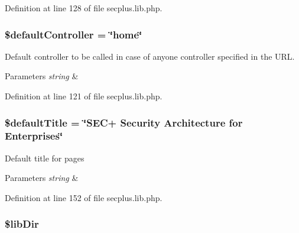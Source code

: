 Definition at line 128 of file secplus.lib.php.

\hypertarget{class_sec_plus_1_1_config_a3fcaeb229c94173ba904952898e7bfed}{
\subsubsection[{\$defaultController}]{\setlength{\rightskip}{0pt plus 5cm}\$defaultController = \char`\"{}home\char`\"{}}}
\label{class_sec_plus_1_1_config_a3fcaeb229c94173ba904952898e7bfed}
Default controller to be called in case of anyone controller specified in the URL. 
\begin{DoxyParams}{Parameters}
{\em string} & \\
\hline
\end{DoxyParams}


Definition at line 121 of file secplus.lib.php.

\hypertarget{class_sec_plus_1_1_config_a180d1e674404fdbb273b10ffce61d7fb}{
\subsubsection[{\$defaultTitle}]{\setlength{\rightskip}{0pt plus 5cm}\$defaultTitle = \char`\"{}SEC+ Security Architecture for Enterprises\char`\"{}}}
\label{class_sec_plus_1_1_config_a180d1e674404fdbb273b10ffce61d7fb}
Default title for pages 
\begin{DoxyParams}{Parameters}
{\em string} & \\
\hline
\end{DoxyParams}


Definition at line 152 of file secplus.lib.php.

\hypertarget{class_sec_plus_1_1_config_a662682afa081c488ee7d6b2de6bd2f6c}{
\subsubsection[{\$libDir}]{\setlength{\rightskip}{0pt plus 5cm}\$libDir}}
\label{class_sec_plus_1_1_config_a662682afa081c488ee7d6b2de6bd2f6c}


